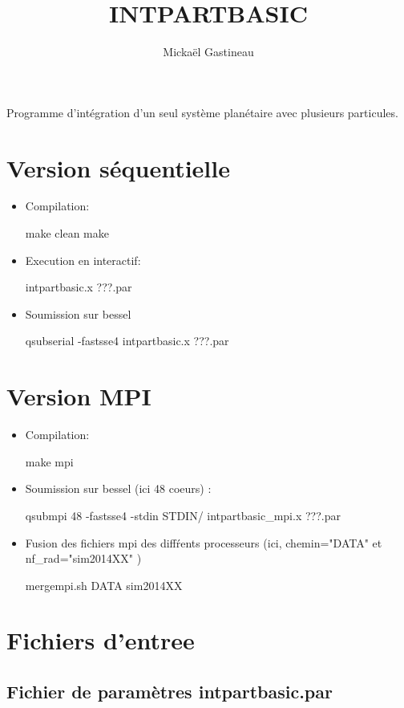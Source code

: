 \documentclass[11pt]{article}
\title{INTPARTBASIC}
\author{Micka\"el Gastineau}
\begin{document}
\maketitle


Programme d'int\'egration d'un seul syst\`eme plan\'etaire avec plusieurs particules.

\section{Version s\'equentielle}

\begin{itemize}
 \item Compilation:  
 
make clean
make
 
\item Execution en interactif: 

intpartbasic.x  ???.par
\item Soumission sur bessel

qsubserial -fastsse4 intpartbasic.x  ???.par
\end{itemize}

\section{Version MPI}

\begin{itemize}
 \item Compilation:  
 
 make mpi
 
\item Soumission sur bessel (ici 48 coeurs) : 

qsubmpi 48 -fastsse4 -stdin STDIN/ intpartbasic\_mpi.x  ???.par

\item Fusion des fichiers mpi des diff\'rents processeurs (ici, chemin="DATA" et nf\_rad="sim2014XX" )

mergempi.sh DATA sim2014XX

\end{itemize}



\section{Fichiers d'entree}

\subsection{Fichier de param\`etres  intpartbasic.par}
\end{document}
